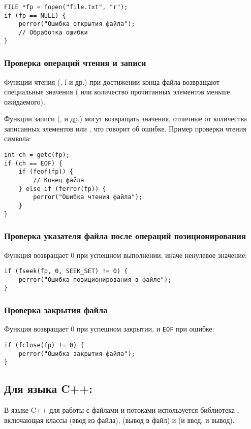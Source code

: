 \begin{verbatim}
FILE *fp = fopen("file.txt", "r");
if (fp == NULL) {
    perror("Ошибка открытия файла");
    // Обработка ошибки
}
\end{verbatim}

\subsubsection{Проверка операций чтения и записи}
Функции чтения (, f и др.) при достижении конца файла возвращают специальные значения (
или количество прочитанных элементов меньше ожидаемого).

Функции записи (,  и др.) могут возвращать значения, отличные от количества записанных элементов или , что говорит об ошибке.
Пример проверки чтения символа:

\begin{verbatim}
int ch = getc(fp);
if (ch == EOF) {
    if (feof(fp)) {
        // Конец файла
    } else if (ferror(fp)) {
        perror("Ошибка чтения файла");
    }
}
\end{verbatim}

\subsubsection{Проверка указателя файла после операций позиционирования}
Функция  возвращает 0 при успешном выполнении, иначе ненулевое значение:
\begin{verbatim}
if (fseek(fp, 0, SEEK_SET) != 0) {
    perror("Ошибка позиционирования в файле");
}
\end{verbatim}

\subsubsection{Проверка закрытия файла}
Функция  возвращает 0 при успешном закрытии, и \verb|EOF| при ошибке:
\begin{verbatim}
if (fclose(fp) != 0) {
    perror("Ошибка закрытия файла");
}
\end{verbatim}

\subsection{Для языка C++:}
В языке C++ для работы с файлами и потоками используется библиотека , включающая классы 
(ввод из файла),  (вывод в файл) и  (и ввод, и вывод).

